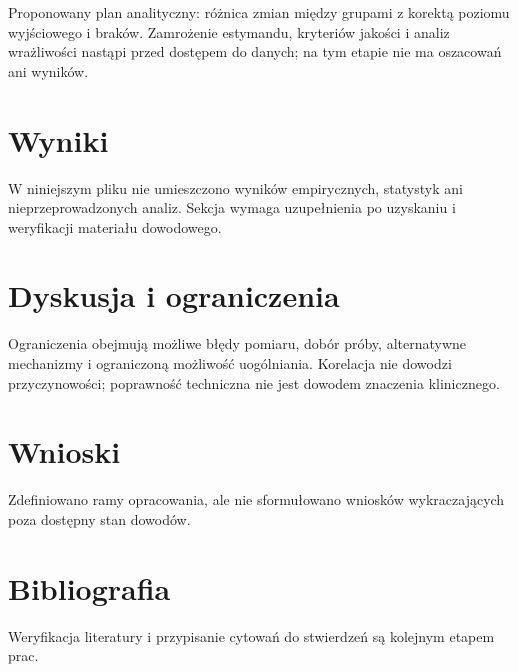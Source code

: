\documentclass[11pt,a4paper]{article}
\begin{document}
Proponowany plan analityczny: różnica zmian między grupami z korektą poziomu wyjściowego i braków. Zamrożenie estymandu, kryteriów jakości i analiz wrażliwości nastąpi przed dostępem do danych; na tym etapie nie ma oszacowań ani wyników.

\section{Wyniki}

W niniejszym pliku nie umieszczono wyników empirycznych, statystyk ani nieprzeprowadzonych analiz. Sekcja wymaga uzupełnienia po uzyskaniu i weryfikacji materiału dowodowego.

\section{Dyskusja i ograniczenia}

Ograniczenia obejmują możliwe błędy pomiaru, dobór próby, alternatywne mechanizmy i ograniczoną możliwość uogólniania. Korelacja nie dowodzi przyczynowości; poprawność techniczna nie jest dowodem znaczenia klinicznego.

\section{Wnioski}

Zdefiniowano ramy opracowania, ale nie sformułowano wniosków wykraczających poza dostępny stan dowodów.

\section*{Bibliografia}

Weryfikacja literatury i przypisanie cytowań do stwierdzeń są kolejnym etapem prac.
\end{document}

